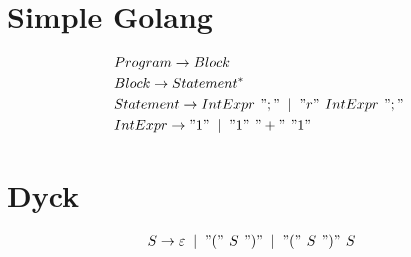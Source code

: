 \documentclass{article}
\begin{document}
\section{Simple Golang}
\begin{align*}
	& Program \to Block  \\
	& Block   \to Statement^* \\
	& Statement \to IntExpr \hspace{4pt} ";" \hspace{4pt} \, | \hspace{4pt} \, "r" \hspace{4pt} IntExpr \hspace{4pt} ";" \\
	& IntExpr \to "1" \hspace{4pt} \, | \, \hspace{4pt} "1" \hspace{4pt} "+" \hspace{4pt} "1"
\end{align*}

\section{Dyck}

\begin{align*}
	& S \to \varepsilon \hspace{4pt} \, | \, \hspace{4pt} "(" \hspace{4pt} S \hspace{4pt} ")" \hspace{4pt} \, | \, \hspace{4pt} "(" \hspace{4pt} S \hspace{4pt} ")" \hspace{4pt} S
\end{align*}
\end{document}
